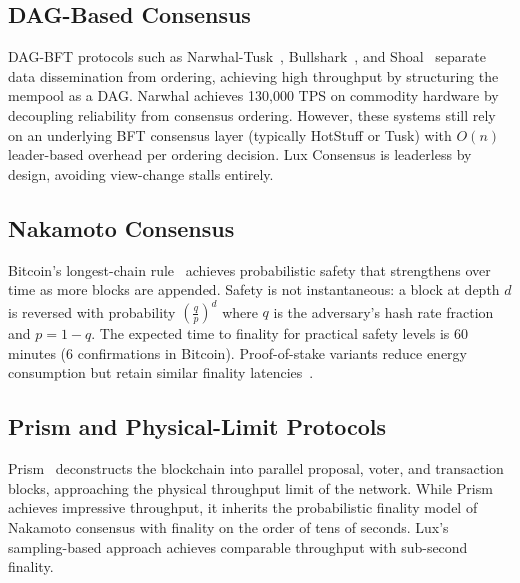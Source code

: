 \subsection{DAG-Based Consensus}

DAG-BFT protocols such as Narwhal-Tusk~\cite{danezis2022narwhal}, Bullshark~\cite{malkhi2022bullshark},
and Shoal~\cite{spiegelman2022shoal} separate data dissemination from ordering, achieving
high throughput by structuring the mempool as a DAG. Narwhal achieves 130,000 TPS on
commodity hardware by decoupling reliability from consensus ordering. However, these systems
still rely on an underlying BFT consensus layer (typically HotStuff or Tusk) with $O(n)$
leader-based overhead per ordering decision. Lux Consensus is leaderless by design, avoiding
view-change stalls entirely.

\subsection{Nakamoto Consensus}

Bitcoin's longest-chain rule~\cite{nakamoto2008bitcoin} achieves probabilistic safety that
strengthens over time as more blocks are appended. Safety is not instantaneous: a block
at depth $d$ is reversed with probability $\left(\frac{q}{p}\right)^d$ where $q$ is the
adversary's hash rate fraction and $p = 1-q$. The expected time to finality for practical
safety levels is 60 minutes (6 confirmations in Bitcoin). Proof-of-stake variants reduce
energy consumption but retain similar finality latencies~\cite{buterin2020ethereum2}.

\subsection{Prism and Physical-Limit Protocols}

Prism~\cite{bagaria2019prism} deconstructs the blockchain into parallel proposal, voter, and
transaction blocks, approaching the physical throughput limit of the network. While Prism
achieves impressive throughput, it inherits the probabilistic finality model of Nakamoto
consensus with finality on the order of tens of seconds. Lux's sampling-based approach
achieves comparable throughput with sub-second finality.

